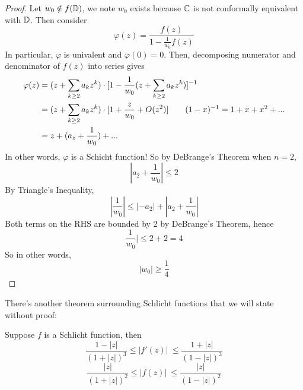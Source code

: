\begin{proof}
    Let $w_0 \notin f(\mathbb{D})$, we note $w_0$ exists because $\mathbb{C}$ is not conformally equivalent with $\mathbb{D}$. Then consider
    \[\varphi(z) = \frac{f(z)}{1 - \frac{1}{w_0}f(z)}\]
    In particular, $\varphi$ is univalent and $\varphi(0) = 0$. Then, decomposing numerator and denominator of $f(z)$ into series gives
    \begin{align*}
        \varphi(z) &= (z + \sum_{k \geq 2} a_k z^k) \cdot [1 - \frac{1}{w_0}(z + \sum_{k \geq 2} a_k z^k)]^{-1}\\
       &= (z + \sum_{k \geq 2} a_k z^k) \cdot [1 + \frac{z}{w_0} + O(z^2)] \tag*{$(1 - x)^{-1} = 1 + x + x^2 + ...$}\\
       &= z + (a_z + \frac{1}{w_0}) + ...
    \end{align*}
    In other words, $\varphi$ is a Schicht function! So by DeBrange's Theorem when $n = 2$,
    \[|a_2 + \frac{1}{w_0}| \leq 2\]
    By Triangle's Inequality,
    \[|\frac{1}{w_0}| \leq |-a_2| + |a_2 + \frac{1}{w_0}|\]
    Both terms on the RHS are bounded by $2$ by DeBrange's Theorem, hence
    \[\frac{1}{w_0}| \leq 2 + 2 = 4\]
    So in other words,
    \[|w_0| \geq \frac{1}{4}\]
\end{proof}

There's another theorem surrounding Schlicht functions that we will state without proof:

\begin{theorem}
    Suppose $f$ is a Schlicht function, then
    \[\frac{1 - |z|}{(1 + |z|)^3} \leq |f'(z)|\ \leq \frac{1 + |z|}{(1 - |z|)^3}\]
    \[\frac{|z|}{(1 + |z|)^2} \leq |f(z)|\ \leq \frac{|z|}{(1 - |z|)^2}\]
\end{theorem}